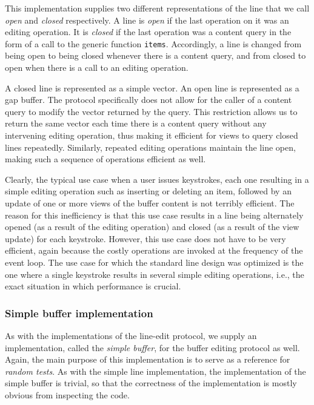 This implementation supplies two different representations of the line
that we call \emph{open} and \emph{closed} respectively.  A line is
\emph{open} if the last operation on it was an editing operation.  It
is \emph{closed} if the last operation was a content query in the
form of a call to the generic function \texttt{items}.  Accordingly, a
line is changed from being open to being closed whenever there is a
content query, and from closed to open when there is a call to an
editing operation.

A closed line is represented as a \commonlisp{} simple vector.  An
open line is represented as a gap buffer. 
The protocol specifically does not allow for the caller of a content
query to modify the vector returned by the query.  This restriction
allows us to return the same vector each time there is a content
query without any intervening editing operation, thus making it
efficient for views to query closed lines repeatedly.  Similarly,
repeated editing operations maintain the line open, making such a
sequence of operations efficient as well.

Clearly, the typical use case when a user issues keystrokes, each one
resulting in a simple editing operation such as inserting or deleting
an item, followed by an update of one or more views of the buffer
content is not terribly efficient.  The reason for this inefficiency
is that this use case results in a line being alternately opened (as a
result of the editing operation) and closed (as a result of the view
update) for each keystroke.  However, this use case does not have to
be very efficient, again because the costly operations are invoked at
the frequency of the event loop.  The use case for which the standard
line design was optimized is the one where a single keystroke results
in several simple editing operations, i.e., the exact situation in
which performance is crucial.

\subsubsection{Simple buffer implementation}

As with the implementations of the line-edit protocol, we supply an
implementation, called the \emph{simple buffer}, for the buffer
editing protocol as well.  Again, the main purpose of this
implementation is to serve as a reference for \emph{random tests}.  As
with the simple line implementation, the implementation of the simple
buffer is trivial, so that the correctness of the implementation is
mostly obvious from inspecting the code.

